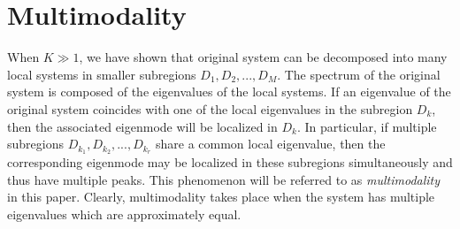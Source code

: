 \documentclass[a4paper,11pt]{article}
\begin{document}
\section{Multimodality}\label{multimodality}
When $K\gg 1$, we have shown that original system can be decomposed into many local systems in smaller subregions $D_1, D_2, ..., D_M$. The spectrum of the original system is composed of the eigenvalues of the local systems. If an eigenvalue of the original system coincides with one of the local eigenvalues in the subregion $D_k$, then the associated eigenmode will be localized in $D_k$. In particular, if multiple subregions $D_{k_1}, D_{k_2}, ..., D_{k_r}$ share a common local eigenvalue, then the corresponding eigenmode may be localized in these subregions simultaneously and thus have multiple peaks. This phenomenon will be referred to as \emph{multimodality} in this paper. Clearly, multimodality takes place when the system has multiple eigenvalues which are approximately equal.
\end{document}
